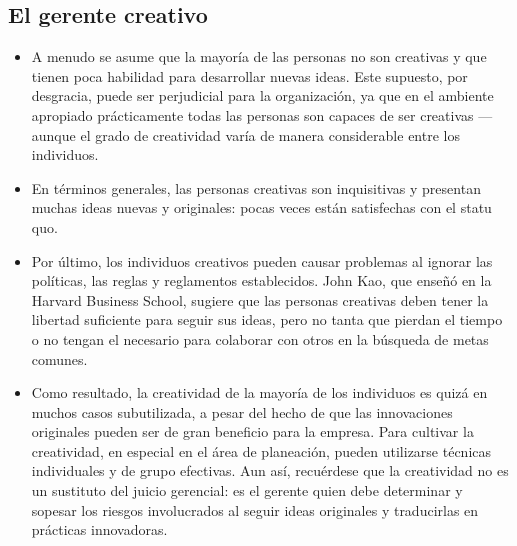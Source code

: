 \documentclass{article}
\begin{document}
\subsection{El gerente creativo}
\begin{itemize}
    \item A menudo se asume que la mayoría de las personas no son creativas y que tienen poca habilidad para desarrollar nuevas ideas. Este supuesto, por desgracia, puede ser perjudicial para la organización, ya que en el ambiente apropiado prácticamente todas las personas son capaces de ser creativas —aunque el grado de creatividad varía de manera considerable entre los individuos.
    \item En términos generales, las personas creativas son inquisitivas y presentan muchas ideas nuevas y originales: pocas veces están satisfechas con el statu quo.
    \item Por último, los individuos creativos pueden causar problemas al ignorar las políticas, las reglas y reglamentos establecidos. John Kao, que enseñó en la Harvard Business School, sugiere que las personas creativas deben tener la libertad suficiente para seguir sus ideas, pero no tanta que pierdan el tiempo o no tengan el necesario para colaborar con otros en la búsqueda de metas comunes.
    \item Como resultado, la creatividad de la mayoría de los individuos es quizá en muchos casos subutilizada, a pesar del hecho de que las innovaciones originales pueden ser de gran beneficio para la empresa. Para cultivar la creatividad, en especial en el área de planeación, pueden utilizarse técnicas individuales y de grupo efectivas. Aun así, recuérdese que la creatividad no es un sustituto del juicio gerencial: es el gerente quien debe determinar y sopesar los riesgos involucrados al seguir ideas originales y traducirlas en prácticas innovadoras.
\end{itemize}





\end{document}
